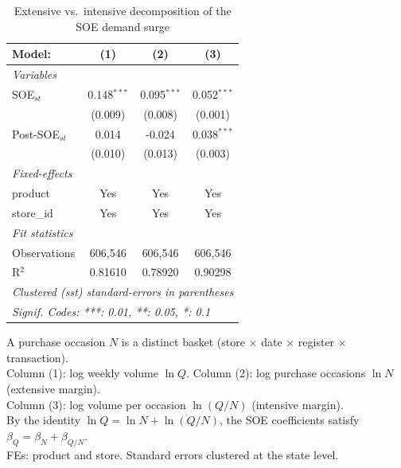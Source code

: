 
\begin{table}[htbp]
   \caption{\label{tab:extensive_intensive} Extensive vs.\ intensive decomposition of the SOE demand surge}
   \centering
   \begin{tabular}{lccc}
      \tabularnewline \midrule \midrule
      Model:          & (1)           & (2)           & (3)\\  
      \midrule
      \emph{Variables}\\
      SOE$_{st}$      & 0.148$^{***}$ & 0.095$^{***}$ & 0.052$^{***}$\\   
                      & (0.009)       & (0.008)       & (0.001)\\   
      Post-SOE$_{st}$ & 0.014         & -0.024        & 0.038$^{***}$\\   
                      & (0.010)       & (0.013)       & (0.003)\\   
      \midrule
      \emph{Fixed-effects}\\
      product         & Yes           & Yes           & Yes\\  
      store\_id       & Yes           & Yes           & Yes\\  
      \midrule
      \emph{Fit statistics}\\
      Observations    & 606,546       & 606,546       & 606,546\\  
      R$^2$           & 0.81610       & 0.78920       & 0.90298\\  
      \midrule \midrule
      \multicolumn{4}{l}{\emph{Clustered (sst) standard-errors in parentheses}}\\
      \multicolumn{4}{l}{\emph{Signif. Codes: ***: 0.01, **: 0.05, *: 0.1}}\\
   \end{tabular}
   
   \par \raggedright 
   A purchase occasion $N$ is a distinct basket (store $\times$ date $\times$ register $\times$ transaction).\\
   Column (1): log weekly volume $\ln Q$. Column (2): log purchase occasions $\ln N$ (extensive margin).\\
   Column (3): log volume per occasion $\ln(Q/N)$ (intensive margin).\\
   By the identity $\ln Q = \ln N + \ln(Q/N)$, the SOE coefficients satisfy $\beta_Q = \beta_N + \beta_{Q/N}$.\\
   FEs: product and store. Standard errors clustered at the state level.
\end{table}


